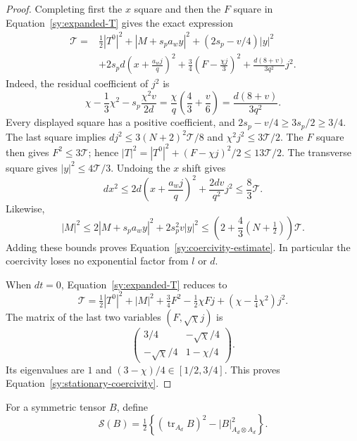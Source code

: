\begin{proof}
Completing first the $x$ square and then the $F$ square in
Equation~\ref{sy:expanded-T} gives the exact expression
\begin{equation}\label{sy:positive-squares}
\begin{aligned}
 \mathcal T={}&\tfrac12|T^0|^2+|M+s_pa_wy|^2
 +(2s_p-v/4)|y|^2\\
 &+2s_pd\left(x+\frac{a_wj}{q}\right)^2
 +\tfrac34\left(F-\frac{\chi j}{3}\right)^2
 +\frac{d(8+v)}{3q^2}j^2.
\end{aligned}
\end{equation}
Indeed, the residual coefficient of $j^2$ is
\[
 \chi-\frac13\chi^2-s_p\frac{\chi^2v}{2d}
 =\frac{\chi}{q}\left(\frac43+\frac v6\right)
 =\frac{d(8+v)}{3q^2}.
\]
Every displayed square has a positive coefficient, and
$2s_p-v/4\ge3s_p/2\ge3/4$.
The last square implies
$dj^2\le3(N+2)^2\mathcal T/8$ and
$\chi^2j^2\le3\mathcal T/2$.
The $F$ square then gives $F^2\le3\mathcal T$; hence
$|T|^2=|T^0|^2+(F-\chi j)^2/2\le13\mathcal T/2$.
The transverse square gives $|y|^2\le4\mathcal T/3$.
Undoing the $x$ shift gives
\[
 dx^2\le2d\left(x+\frac{a_wj}{q}\right)^2
            +\frac{2dv}{q^2}j^2
 \le\frac{8}{3}\mathcal T.
\]
Likewise,
\[
 |M|^2\le2|M+s_pa_wy|^2+2s_p^2v|y|^2
 \le\left(2+\frac43(N+\tfrac12)\right)\mathcal T.
\]
Adding these bounds proves Equation~\ref{sy:coercivity-estimate}.
In particular the coercivity loses no exponential factor from
$l$ or $d$.

When $dt=0$, Equation~\ref{sy:expanded-T} reduces to
\[
 \mathcal T=\tfrac12|T^0|^2+|M|^2
 +\tfrac34F^2-\tfrac12\chi Fj
 +(\chi-\tfrac14\chi^2)j^2.
\]
The matrix of the last two variables $(F,\sqrt\chi j)$ is
\[
 \begin{pmatrix}3/4&-\sqrt\chi/4\\
                 -\sqrt\chi/4&1-\chi/4\end{pmatrix}.
\]
Its eigenvalues are $1$ and $(3-\chi)/4\in[1/2,3/4]$.
This proves Equation~\ref{sy:stationary-coercivity}.
\end{proof}

For a symmetric tensor $B$, define
\begin{equation}\label{sy:S-definition}
 \mathcal S(B)=\tfrac12\left\{
     (\operatorname{tr}_{A_d}B)^2
       -|B|_{A_d\otimes A_d}^2\right\}.
\end{equation}

